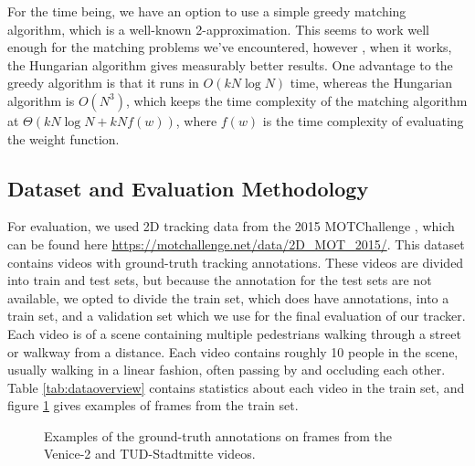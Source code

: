 \documentclass[10pt,twocolumn,letterpaper]{article}
\begin{document}
For the time being, we have an option to use a simple greedy matching algorithm, which is a well-known 2-approximation.
This seems to work well enough for the matching problems we've encountered, however , when it works, the Hungarian algorithm gives measurably better results.
One advantage to the greedy algorithm is that it runs in $O(k N \log N)$ time, whereas the Hungarian algorithm is $O(N^3)$, which keeps the time complexity of the matching algorithm at $\Theta(k N \log N + kNf(w))$, where $f(w)$ is the time complexity of evaluating the weight function.




\subsection{Dataset and Evaluation Methodology}
For evaluation, we used 2D tracking data from the 2015 MOTChallenge \cite{motchallenge2015}, which can be found here \url{https://motchallenge.net/data/2D_MOT_2015/}. This dataset contains videos with ground-truth tracking annotations. These videos are divided into train and test sets, but because the annotation for the test sets are not available, we opted to divide the train set, which does have annotations, into a train set, and a validation set which we use for the final evaluation of our tracker. Each video is of a scene containing multiple pedestrians walking through a street or walkway from a distance. Each video contains roughly 10 people in the scene, usually walking in a linear fashion, often passing by and occluding each other. Table \ref{tab:dataoverview} contains statistics about each video in the train set, and figure \ref{fig:example_frame_train} gives examples of frames from the train set.


\begin{figure}%
    \centering
    \qquad
    \caption{Examples of the ground-truth annotations on frames from the Venice-2 and TUD-Stadtmitte videos.}%
    \label{fig:example_frame_train}%
\end{figure}
\end{document}
